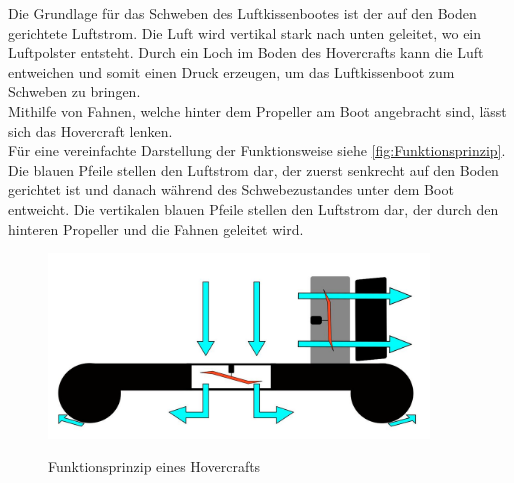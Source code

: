 Die Grundlage für das Schweben des Luftkissenbootes ist der auf den Boden gerichtete Luftstrom. Die Luft wird vertikal stark nach unten geleitet, wo ein Luftpolster entsteht. 
Durch ein Loch im Boden des Hovercrafts kann die Luft entweichen und somit einen Druck erzeugen, um das Luftkissenboot zum Schweben zu bringen. \\
Mithilfe von Fahnen, welche hinter dem Propeller am Boot angebracht sind, lässt sich das Hovercraft lenken. \\ Für eine vereinfachte Darstellung der Funktionsweise siehe 
\autoref{fig:Funktionsprinzip}. Die blauen Pfeile stellen den Luftstrom dar, der zuerst senkrecht auf den Boden gerichtet ist und danach während des Schwebezustandes unter dem Boot
entweicht. Die vertikalen blauen Pfeile stellen den Luftstrom dar, der durch den hinteren Propeller und die Fahnen geleitet wird. 

\begin{figure}[H]
  \centering
  \includegraphics[width=0.9\textwidth]{Fotos/Funktionsprinzip.JPG}
  \label{fig:Funktionsprinzip}
  \caption{Funktionsprinzip eines Hovercrafts}
\end{figure}